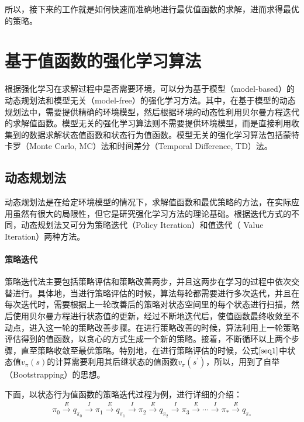 所以，接下来的工作就是如何快速而准确地进行最优值函数的求解，进而求得最优的策略。

\section{基于值函数的强化学习算法}

根据强化学习在求解过程中是否需要环境，可以分为基于模型（model-based）的动态规划法和模型无关（model-free）的强化学习方法。其中，在基于模型的动态规划法中，需要提供精确的环境模型，然后根据环境的动态性利用贝尔曼方程迭代的求解值函数。模型无关的强化学习算法则不需要提供环境模型，而是直接利用收集到的数据求解状态值函数和状态行为值函数。模型无关的强化学习算法包括蒙特卡罗（Monte Carlo, MC）法和时间差分（Temporal Difference, TD）法\citep{2016面向强化学习的模型学习算法研究}。

\subsection{动态规划法}
动态规划法是在给定环境模型的情况下，求解值函数和最优策略的方法，在实际应用虽然有很大的局限性，但它是研究强化学习方法的理论基础。根据迭代方式的不同，动态规划法又可分为策略迭代（Policy Iteration）和值迭代（ Value Iteration）两种方法。
\paragraph{策略迭代}

策略迭代法主要包括策略评估和策略改善两步，并且这两步在学习的过程中依次交替进行。具体地，当进行策略评估的时候，算法每轮都需要进行多次迭代，并且在每次迭代时，需要根据上一轮改善后的策略对状态空间里的每个状态进行扫描，然后使用贝尔曼方程进行状态值的更新，经过不断地迭代后，使值函数最终收敛至不动点，进入这一轮的策略改善步骤。在进行策略改善的时候，算法利用上一轮策略评估得到的值函数，以贪心的方式生成一个新的策略。接着，不断循环以上两个步骤，直至策略收敛至最优策略。特别地，在进行策略评估的时候，公式$\eqref{seq1}$中状态值$v_{\pi}(s)$的计算需要利用其后继状态的值函数$v_{\pi}(s^{'})$，所以，用到了自举（Bootstrapping）的思想。

下面，以状态行为值函数的策略迭代过程为例，进行详细的介绍：
\begin{displaymath}
\begin{aligned}
\pi_{0}\xrightarrow{E}q_{\pi_0}\xrightarrow{I}\pi_{1}\xrightarrow{E}q_{\pi_1}\xrightarrow{I}\pi_{2}\xrightarrow{E}q_{\pi_2}\xrightarrow{I}\pi_{3}\xrightarrow{E} \cdots \xrightarrow{I}\pi_{*}\xrightarrow{E}q_{\pi_{*}}
\end{aligned}
\end{displaymath}

